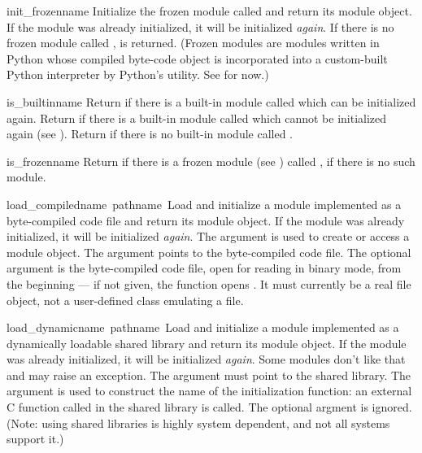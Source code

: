 \begin{funcdesc}{init_frozen}{name}
Initialize the frozen module called  and return its module
object.  If the module was already initialized, it will be initialized
{\em again}.  If there is no frozen module called ,
 is returned.  (Frozen modules are modules written in
Python whose compiled byte-code object is incorporated into a
custom-built Python interpreter by Python's  utility.
See  for now.)
\end{funcdesc}

\begin{funcdesc}{is_builtin}{name}
Return  if there is a built-in module called  which can be
initialized again.  Return  if there is a built-in module
called  which cannot be initialized again (see
).  Return  if there is no built-in module
called .
\end{funcdesc}

\begin{funcdesc}{is_frozen}{name}
Return  if there is a frozen module (see )
called ,  if there is no such module.
\end{funcdesc}

\begin{funcdesc}{load_compiled}{name\, pathname\, }
Load and initialize a module implemented as a byte-compiled code file
and return its module object.  If the module was already initialized,
it will be initialized {\em again}.  The  argument is used
to create or access a module object.  The  argument
points to the byte-compiled code file.  The optional 
argument is the byte-compiled code file, open for reading in binary
mode, from the beginning --- if not given, the function opens
.  It must currently be a real file object, not a
user-defined class emulating a file.
\end{funcdesc}

\begin{funcdesc}{load_dynamic}{name\, pathname\, }
Load and initialize a module implemented as a dynamically loadable
shared library and return its module object.  If the module was
already initialized, it will be initialized {\em again}.  Some modules
don't like that and may raise an exception.  The 
argument must point to the shared library.  The  argument is
used to construct the name of the initialization function: an external
C function called  in the shared library is
called.  The optional  argment is ignored.  (Note: using
shared libraries is highly system dependent, and not all systems
support it.)
\end{funcdesc}

